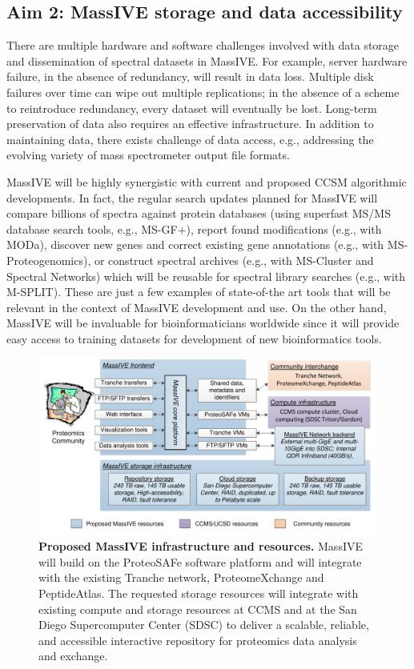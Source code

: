 \documentclass[arial,11pt]{article}
\begin{document}
\subsection{Aim 2: MassIVE storage and data accessibility}

There are multiple hardware and software challenges involved with data storage and dissemination of spectral datasets in MassIVE. For example, server hardware failure, in the absence of redundancy, will  result in data loss. Multiple disk failures over time can wipe out multiple replications; in the absence of a scheme to reintroduce redundancy, every dataset will eventually be lost. Long-term preservation of data also requires an effective infrastructure. In addition to maintaining data, there exists challenge of data access, e.g., addressing the evolving variety of mass spectrometer output file formats.

MassIVE will be highly synergistic with current and proposed CCSM algorithmic developments.  In fact, the regular search updates planned for MassIVE will compare billions of spectra against protein databases (using superfast MS/MS database search tools, e.g., MS-GF+), report found modifications (e.g., with MODa), discover new genes and correct existing gene annotations (e.g., with MS-Proteogenomics), or construct spectral archives (e.g., with MS-Cluster and Spectral Networks) which will be reusable for spectral library searches (e.g., with M-SPLIT). These are just a few examples of state-of-the art tools that will be relevant in the context of MassIVE development and use. On the other hand, MassIVE will be invaluable for bioinformaticians worldwide since it will provide easy access to training datasets for development of new  bioinformatics tools.

\begin{figure}[ht]
  \centering
  \includegraphics[width=\textwidth]{figures/Architecture.pdf}
  \caption{\footnotesize {\bf Proposed MassIVE infrastructure and resources.} MassIVE will build on the ProteoSAFe software platform and will integrate with the existing Tranche network, ProteomeXchange and PeptideAtlas. The requested storage resources will integrate with existing compute and storage resources at CCMS and at the San Diego Supercomputer Center (SDSC) to deliver a scalable, reliable, and accessible interactive repository for proteomics data analysis and exchange.}
  \label{trd.software.fig.massiveArch}
\end{figure}
\end{document}
